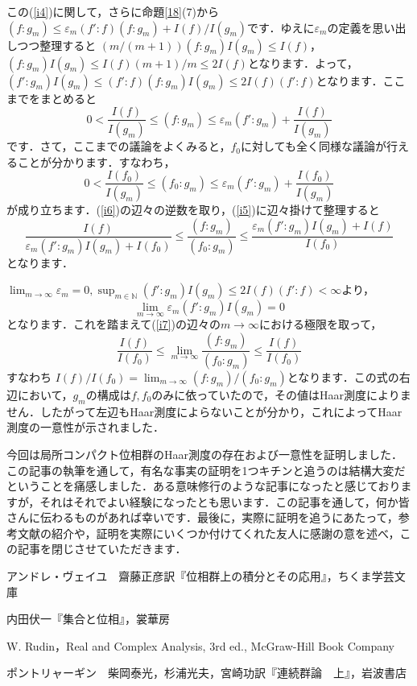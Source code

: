 \begin{Proof}
この(\ref{i4})に関して，さらに命題\ref{18}(7)から$\left( f : g_{m} \right) \le \varepsilon_{m} \left( f' : f \right) \left( f : g_{m} \right) + I(f)/I(g_{m})$です．ゆえに$\varepsilon_{m}$の定義を思い出しつつ整理すると $\left( m/(m+1) \right) \left( f : g_{m} \right)I(g_{m}) \le I(f)$，$\left( f : g_{m} \right)I(g_{m}) \le I(f)(m+1)/m \le 2I(f)$となります．よって，$ \left( f' : g_{m} \right)I(g_{m}) \le 
\left( f' : f \right) \left( f : g_{m} \right) I(g_{m}) \le 2I(f)\left( f' : f \right)$となります．ここまでをまとめると
\begin{equation}
0<\frac{I(f)}{I(g_{m})} \le \left( f : g_{m} \right) \le \varepsilon_{m} \left( f' : g_{m} \right) + \frac{I(f)}{I(g_{m})}
\label{i5}
\end{equation}
です．さて，ここまでの議論をよくみると，$f_0$に対しても全く同様な議論が行えることが分かります．すなわち，
\begin{equation}
0<\frac{I(f_0)}{I(g_{m})} \le \left( f_0 : g_{m} \right) \le \varepsilon_{m} \left( f' : g_{m} \right) +\frac{I(f_0)}{I(g_{m})}
\label{i6}
\end{equation}
が成り立ちます．(\ref{i6})の辺々の逆数を取り，(\ref{i5})に辺々掛けて整理すると
\begin{equation}
\frac{I(f)}{\varepsilon_{m} \left( f' : g_{m} \right)I(g_{m}) + I(f_0)} \le \frac{(f : g_{m}) }{(f_0 : g_{m})} \le \frac{ \varepsilon_{m} \left( f' : g_{m} \right)I(g_{m}) + I(f) }{I(f_0)}
\label{i7}
\end{equation}
となります．

$\lim_{m \to \infty}\varepsilon_{m} =0, \sup_{m \in \mathbb{N}}\left( f' : g_{m} \right)I(g_{m}) \le 2I(f)\left( f' : f \right) < \infty$より，
\[
\lim_{m \to \infty}\varepsilon_{m} \left( f' : g_{m} \right)I(g_{m})=0
\]
となります．これを踏まえて(\ref{i7})の辺々の$m \to \infty$における極限を取って，
\[
\frac{I(f)}{I(f_{0})} \le \lim_{m \to \infty} \frac{\left(f : g_{m} \right)}{\left( f_{0} : g_{m} \right)} \le \frac{I(f)}{I(f_{0})}
\]
すなわち $I(f)/I(f_{0})=\lim_{m \to \infty} \left( f : g_{m} \right) / \left( f_{0} : g_{m} \right)$となります．この式の右辺において，$g_{m}$の構成は$f, f_{0}$のみに依っていたので，その値はHaar測度によりません．したがって左辺もHaar測度によらないことが分かり，これによってHaar測度の一意性が示されました．　
\end{Proof}

今回は局所コンパクト位相群のHaar測度の存在および一意性を証明しました．この記事の執筆を通して，有名な事実の証明を1つキチンと追うのは結構大変だということを痛感しました．ある意味修行のような記事になったと感じておりますが，それはそれでよい経験になったとも思います．この記事を通して，何か皆さんに伝わるものがあれば幸いです．最後に，実際に証明を追うにあたって，参考文献の紹介や，証明を実際にいくつか付けてくれた友人に感謝の意を述べ，この記事を閉じさせていただきます．

\begin{thebibliography}{9}
\item アンドレ・ヴェイユ　齋藤正彦訳『位相群上の積分とその応用』，ちくま学芸文庫
\item 内田伏一『集合と位相』，裳華房
\item W. Rudin，Real and Complex Analysis, 3rd ed., McGraw-Hill Book Company
\item ポントリャーギン　柴岡泰光，杉浦光夫，宮崎功訳『連続群論　上』，岩波書店
\end{thebibliography}

